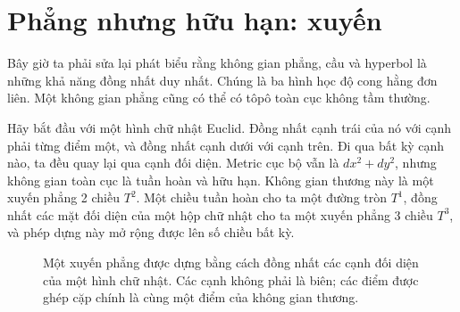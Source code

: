 \section{Phẳng nhưng hữu hạn: xuyến}

Bây giờ ta phải sửa lại phát biểu rằng không gian phẳng, cầu và hyperbol là những khả năng đồng nhất duy nhất. Chúng là ba hình học độ cong hằng đơn liên. Một không gian phẳng cũng có thể có tôpô toàn cục không tầm thường.

Hãy bắt đầu với một hình chữ nhật Euclid. Đồng nhất cạnh trái của nó với cạnh phải từng điểm một, và đồng nhất cạnh dưới với cạnh trên. Đi qua bất kỳ cạnh nào, ta đều quay lại qua cạnh đối diện. Metric cục bộ vẫn là \(dx^2+dy^2\), nhưng không gian toàn cục là tuần hoàn và hữu hạn. Không gian thương này là một xuyến phẳng 2 chiều \(T^2\). Một chiều tuần hoàn cho ta một đường tròn \(T^1\), đồng nhất các mặt đối diện của một hộp chữ nhật cho ta một xuyến phẳng 3 chiều \(T^3\), và phép dựng này mở rộng được lên số chiều bất kỳ.

\begin{figure}[htbp]
\centering
{}
\caption{Một xuyến phẳng được dựng bằng cách đồng nhất các cạnh đối diện của một hình chữ nhật. Các cạnh không phải là biên; các điểm được ghép cặp chính là cùng một điểm của không gian thương.}
\label{fig:c03-flat-torus}
\end{figure}

\begin{classroomqa}
\end{classroomqa}

